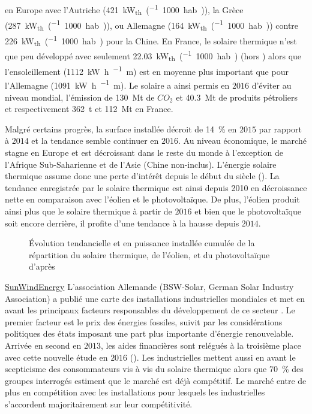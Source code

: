 en Europe avec l’Autriche (\SI{421}{\kilo\watt_{th}\per(1000 hab.)}), la Grèce
(\SI{287}{\kilo\watt_{th}\per(1000 hab.)}), ou Allemagne
(\SI{164}{\kilo\watt_{th}\per(1000 hab.)}) contre \SI{226}{\kilo\watt_{th}\per(1000 hab.)}
pour la Chine. En France, le solaire thermique n’est que peu développé avec seulement
\SI{22.03}{\kilo\watt_{th}\per(1000 hab.)} (hors ) alors que l’ensoleillement
(\SI{1112}{\kilo\watt\hour\per\squared\metre}) est en moyenne plus important que
pour l’Allemagne (\SI{1091}{\kilo\watt\hour\per\squared\metre}).
Le solaire a ainsi permis en $2016$ d’éviter au niveau mondial, l’émission de
\SI{130}{\mega\tonne} de $CO_{2}$ et \SI{40.3}{\mega\tonne} de produits pétroliers et
respectivement \SI{362}{\tonne} et \SI{112}{\mega\tonne} en France.

Malgré certains progrès, la surface installée décroit de \SI{14}{\percent} en
$2015$ par rapport à $2014$ et la tendance semble continuer en $2016$. Au niveau
économique, le marché stagne en Europe et est décroissant dans le reste du monde à
l’exception de l’Afrique Sub-Saharienne et de l’Asie (Chine non-inclus).
L’énergie solaire thermique assume donc une perte d’intérêt depuis le début du siècle
(). La tendance enregistrée par le solaire thermique est ainsi
depuis 2010 en décroissance nette en comparaison avec l’éolien et le photovoltaïque. De
plus, l’éolien produit ainsi plus que le solaire thermique à partir de $2016$ et bien que
le photovoltaïque soit encore derrière, il profite d’une tendance à la hausse depuis
$2014$.

\begin{figure}
    \centering
    \caption{Évolution tendancielle et en puissance installée cumulée de la répartition
             du solaire thermique, de l’éolien, et du photovoltaïque d’après
             \textcite{Weiss2017}}
    \label{fig:tendances_enr}
\end{figure}
\href{http://www.sunwindenergy.com/content/solar-process-heat-surprisingly-popular}{SunWindEnergy}
L’association Allemande (\textsf{BSW-Solar}, German Solar Industry Association)
a publié une carte des installations industrielles mondiales et met en avant les
principaux facteurs responsables du développement de ce secteur \parencite{Augsten2017}.
Le premier facteur est le prix des énergies fossiles, suivit par les considérations
politiques des états imposant une part plus importante d’énergie renouvelable. Arrivée
en second en $2013$, les aides financières sont relégués à la troisième place avec
cette nouvelle étude en $2016$ (). Les industrielles
mettent aussi en avant le scepticisme des consommateurs vis à vis du solaire thermique
alors que \SI{70}{\percent} des groupes interrogés estiment que le marché est déjà
compétitif. Le marché entre de plus en compétition avec les installations  pour
lesquels les industrielles s’accordent majoritairement sur leur compétitivité.

